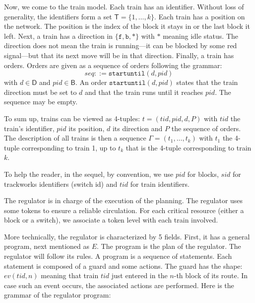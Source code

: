\documentclass[runningheads]{llncs}
\newcommand{\directions}{{\mathsf{D}}}
\newcommand{\blocks}{{\mathsf{B}}}
\newcommand{\forward}{{\mathtt{f}}}
\newcommand{\backward}{{\mathtt{b}}}
\newcommand{\idle}{{\mathtt{*}}}
\newcommand{\su}{{\mbox{$\mathtt{startuntil}$}}\xspace}
\newcommand{\trains}{{\mathsf{T}}}
\begin{document}
Now, we come to the train model. Each train has an identifier. Without loss of generality, the identifiers form a set  $\trains = \{1, \ldots, k\}$. Each train has a position on the network. The position is the index of the block it stays in or the last block it left. Next, a train has a direction in $\{\forward, \backward, \idle\}$ with $\idle$ meaning idle status.  The direction does not mean the train is running---it can be blocked by some red signal---but that its next move will be in that direction. Finally, a train has orders. Orders are given as a sequence of orders following the grammar:
$$  seq ::= \su(d,pid) $$
with $d \in \directions$ and $pid \in \blocks$. An order $\su(d, pid)$ states that the train direction must be set to $d$ and that the train runs until it reaches $pid$.  The sequence may be empty. 

To sum up, trains can be viewed as 4-tuples: $t = (tid, pid, d, P)$ with $tid$ the train's identifier, $pid$ its position, $d$ its direction and $P$ the sequence of orders. The description of all trains is then a sequence $\Gamma = (t_1, \ldots, t_k)$ with $t_1$ the 4-tuple corresponding to train 1, up to $t_k$ that is the 4-tuple corresponding to train $k$. 

To help the reader, in the sequel, by convention, we use $pid$ for blocks, $sid$ for trackworks identifiers (switch id) and $tid$ for train identifiers.  

The regulator is in charge of the execution of the planning. The regulator uses some tokens to ensure a reliable circulation. For each critical resource (either a block or a switch), we associate a token level with each train involved. 

More technically, the regulator is characterized by 5 fields. First, it has a general program, next mentioned as $E$. The program is the plan of the regulator. The regulator will follow its rules. A program is a sequence of statements. Each statement is composed of a guard and some actions. The guard has the shape: $ev(tid, n)$ meaning that train $tid$ just entered in the $n$-th block of its route. In case such an event occurs, the associated actions are performed. Here is the grammar of the regulator program:
\end{document}
